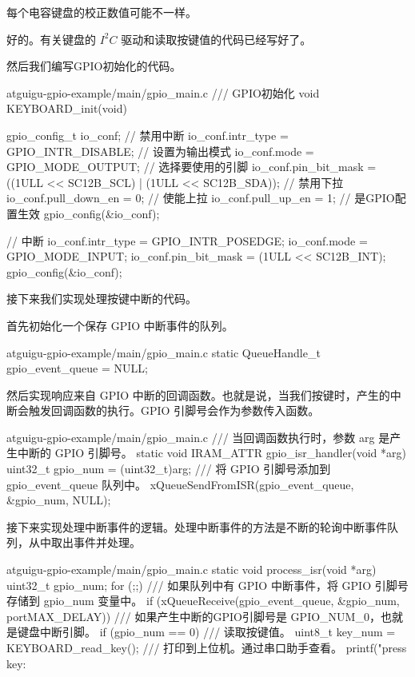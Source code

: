 \documentclass[lang=cn,newtx,10pt,scheme=chinese]{elegantbook}
\begin{document}
\begin{marker}
每个电容键盘的校正数值可能不一样。
\end{marker}

好的。有关键盘的 $I^2C$ 驱动和读取按键值的代码已经写好了。

然后我们编写GPIO初始化的代码。

\begin{mycode}{atguigu-gpio-example/main/gpio\_main.c}
/// GPIO初始化
void KEYBOARD_init(void)
{
    gpio_config_t io_conf;
    // 禁用中断
    io_conf.intr_type = GPIO_INTR_DISABLE;
    // 设置为输出模式
    io_conf.mode = GPIO_MODE_OUTPUT;
    // 选择要使用的引脚
    io_conf.pin_bit_mask = ((1ULL << SC12B_SCL) | (1ULL << SC12B_SDA));
    // 禁用下拉
    io_conf.pull_down_en = 0;
    // 使能上拉
    io_conf.pull_up_en = 1;
    // 是GPIO配置生效
    gpio_config(&io_conf);

    // 中断
    io_conf.intr_type = GPIO_INTR_POSEDGE;
    io_conf.mode = GPIO_MODE_INPUT;
    io_conf.pin_bit_mask = (1ULL << SC12B_INT);
    gpio_config(&io_conf);
}
\end{mycode}

接下来我们实现处理按键中断的代码。

首先初始化一个保存 GPIO 中断事件的队列。

\begin{mycode}{atguigu-gpio-example/main/gpio\_main.c}
static QueueHandle_t gpio_event_queue = NULL;
\end{mycode}

然后实现响应来自 GPIO 中断的回调函数。也就是说，当我们按键时，产生的中断会触发回调函数的执行。GPIO 引脚号会作为参数传入函数。

\begin{mycode}{atguigu-gpio-example/main/gpio\_main.c}
/// 当回调函数执行时，参数 arg 是产生中断的 GPIO 引脚号。
static void IRAM_ATTR gpio_isr_handler(void *arg)
{
    uint32_t gpio_num = (uint32_t)arg;
    /// 将 GPIO 引脚号添加到 gpio_event_queue 队列中。
    xQueueSendFromISR(gpio_event_queue, &gpio_num, NULL);
}
\end{mycode}

接下来实现处理中断事件的逻辑。处理中断事件的方法是不断的轮询中断事件队列，从中取出事件并处理。

\begin{mycode}{atguigu-gpio-example/main/gpio\_main.c}
static void process_isr(void *arg)
{
    uint32_t gpio_num;
    for (;;)
    {
        /// 如果队列中有 GPIO 中断事件，将 GPIO 引脚号存储到 gpio_num 变量中。
        if (xQueueReceive(gpio_event_queue, &gpio_num, portMAX_DELAY))
        {
            /// 如果产生中断的GPIO引脚号是 GPIO_NUM_0，也就是键盘中断引脚。
            if (gpio_num == 0)
            {
                /// 读取按键值。
                uint8_t key_num = KEYBOARD_read_key();
                /// 打印到上位机。通过串口助手查看。
                printf("press key: %
            }
        }
    }
}
\end{mycode}
\end{document}
